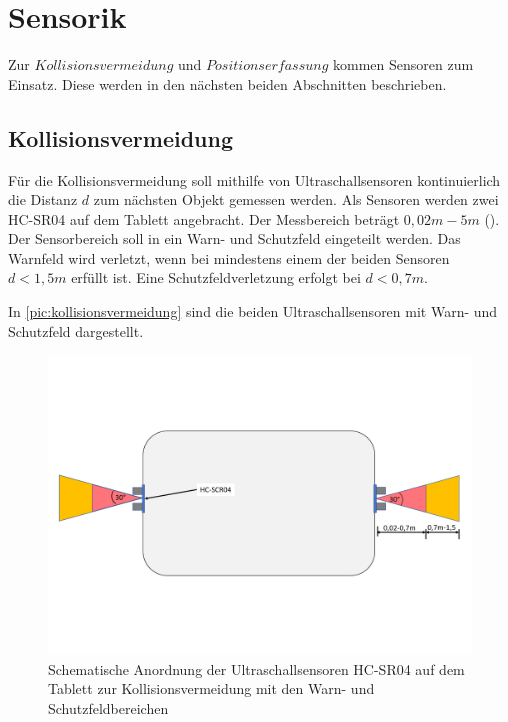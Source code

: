 \newpage

\section{Sensorik}
\label{sec:konzeptSensorik}
Zur $Kollisionsvermeidung$ und $Positionserfassung$ kommen Sensoren zum Einsatz. Diese werden in den nächsten beiden Abschnitten beschrieben.

\subsection{Kollisionsvermeidung}
\label{sec:konzeptKollisionsvermeidung}
Für die Kollisionsvermeidung soll mithilfe von Ultraschallsensoren kontinuierlich die Distanz $d$ zum nächsten Objekt gemessen werden. Als Sensoren werden zwei HC-SR04 auf dem Tablett angebracht. Der Messbereich beträgt $0,02m - 5m$ (\cite{hcrs04}). Der Sensorbereich soll in ein Warn- und Schutzfeld eingeteilt werden. Das Warnfeld wird verletzt, wenn bei mindestens einem der beiden Sensoren $d<1,5m$ erfüllt ist. Eine Schutzfeldverletzung erfolgt bei $d<0,7m$. 

In \autoref{pic:kollisionsvermeidung} sind die beiden Ultraschallsensoren mit Warn- und Schutzfeld dargestellt. 

\begin{figure}[h]
	\begin{center}
		\includegraphics[width=16cm]{kollisionsvermeidung.pdf}
		\caption{Schematische Anordnung der Ultraschallsensoren HC-SR04 auf dem Tablett zur Kollisionsvermeidung mit den Warn- und Schutzfeldbereichen}
		\label{pic:kollisionsvermeidung}
	\end{center}
\end{figure}
\newpage

